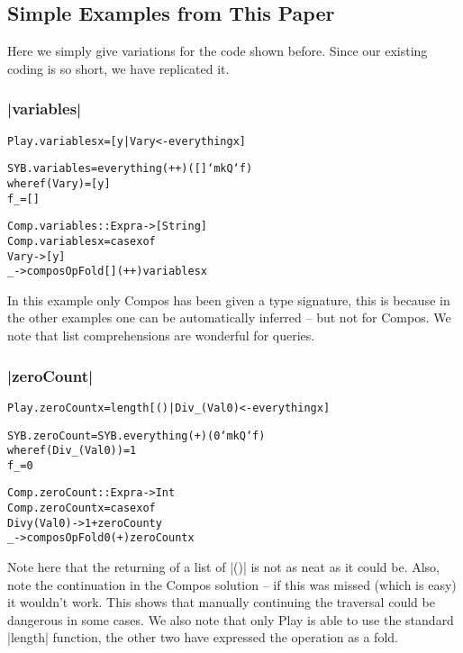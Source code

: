 \documentclass[preprint]{sigplanconf}
\newenvironment{code}{\begin{alltt}\small}{\end{alltt}}
\begin{document}
\subsection{Simple Examples from This Paper}

Here we simply give variations for the code shown before. Since our existing coding is so short, we have replicated it.

\subsubsection{|variables|}

\begin{code}
Play.variables x = [y | Var y <- everything x]

SYB.variables = everything (++) ([] `mkQ` f)
    where  f (Var y)  = [y]
           f _        = []

Comp.variables :: Expr a -> [String]
Comp.variables x = case x of
    Var y -> [y]
    _ -> composOpFold [] (++) variables x
\end{code}

In this example only Compos has been given a type signature, this is because in the other examples one can be automatically inferred -- but not for Compos. We note that list comprehensions are wonderful for queries.

\subsubsection{|zeroCount|}

\begin{code}
Play.zeroCount x = length [() | Div _ (Val 0) <- everything x]

SYB.zeroCount = SYB.everything (+) (0 `mkQ` f)
    where  f (Div _ (Val 0))  = 1
           f _                = 0

Comp.zeroCount :: Expr a -> Int
Comp.zeroCount x = case x of
    Div y (Val 0) -> 1 + zeroCount y
    _ -> composOpFold 0 (+) zeroCount x
\end{code}

Note here that the returning of a list of |()| is not as neat as it could be. Also, note the continuation in the Compos solution -- if this was missed (which is easy) it wouldn't work. This shows that manually continuing the traversal could be dangerous in some cases. We also note that only Play is able to use the standard |length| function, the other two have expressed the operation as a fold.
\end{document}
